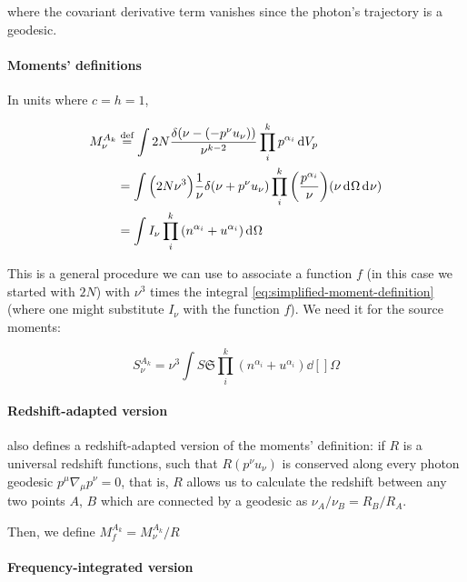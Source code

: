 \documentclass[main.tex]{subfiles}
\begin{document}
where the covariant derivative term vanishes since the photon's trajectory is a geodesic.

\paragraph{Moments' definitions}

In units where \(c=h=1\),

\begin{subequations}
\begin{align}
   M _\nu ^{A_k}
   &\defeq \int 2N \frac{\delta (\nu - (-p^\nu u_\nu))}{\nu^{k-2}} \prod_i^k p^{\alpha_i} \dd{V_p} \\
   &= \int \qty(2N \nu^3) \frac{1}{\nu} \delta (\nu +p^\nu u_\nu) \prod_i^k \qty(\frac{p^{\alpha_i}}{\nu}) \qty(\nu \dd[]{\Omega} \dd[]{\nu})  \\
   &= \int  I_\nu \prod_i^k \qty(n^{\alpha_i} + u^{\alpha_i}) \dd[]{\Omega} \label{eq:simplified-moment-definition}
\end{align}
\end{subequations}

This is a general procedure we can use to associate a function \(f\) (in this case we started with \(2N\)) with \(\nu^3\) times the integral \eqref{eq:simplified-moment-definition} (where one might substitute \(I _\nu\) with the function \(f\)).
We need it for the source moments:

\begin{equation}
   S_\nu ^{A_k} = \nu^3 \int S \mathfrak S \prod_i^k (n^{\alpha_i} + u^{\alpha_i}) \dd[]{\Omega}
\end{equation}

\paragraph{Redshift-adapted version}

\textcite[]{Thorne:1981feb} also defines a redshift-adapted version of the moments' definition: if \(R\) is a universal redshift functions, such that \(R (p^\nu u_\nu)\) is conserved along every photon geodesic \(p^\mu \nabla_\mu p^\nu = 0\), that is, \(R\) allows us to calculate the redshift between any two points \(A\), \(B\) which are connected by a geodesic as \(\nu_A / \nu_B = R_B / R_A\).

Then, we define \( M_f ^{A_k} =  M_{\nu} ^{A_k} / R\)

\paragraph{Frequency-integrated version}
\end{document}
